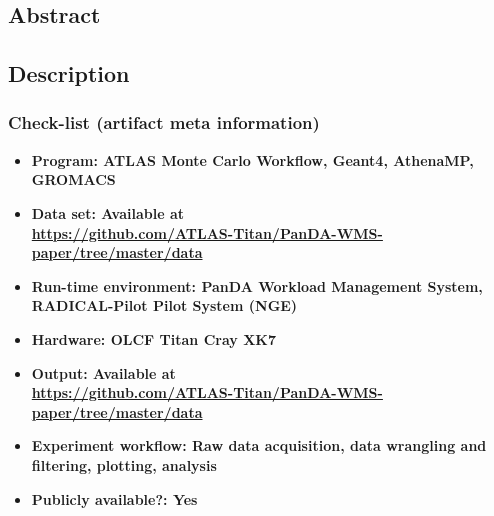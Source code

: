 \subsection{Abstract}




\subsection{Description}

\subsubsection{Check-list (artifact meta information)}

{\small
\begin{itemize}
  \item {\bf Program: ATLAS Monte Carlo Workflow, Geant4, AthenaMP, GROMACS}
  \item {\bf Data set: Available at \\ \url{https://github.com/ATLAS-Titan/PanDA-WMS-paper/tree/master/data}}
  \item {\bf Run-time environment: PanDA Workload Management System, RADICAL-Pilot Pilot System (NGE)}
  \item {\bf Hardware: OLCF Titan Cray XK7}
  \item {\bf Output: Available at \\ \url{https://github.com/ATLAS-Titan/PanDA-WMS-paper/tree/master/data}}
  \item {\bf Experiment workflow: Raw data acquisition, data wrangling and filtering, plotting, analysis}
  \item {\bf Publicly available?: Yes}
\end{itemize}
}

